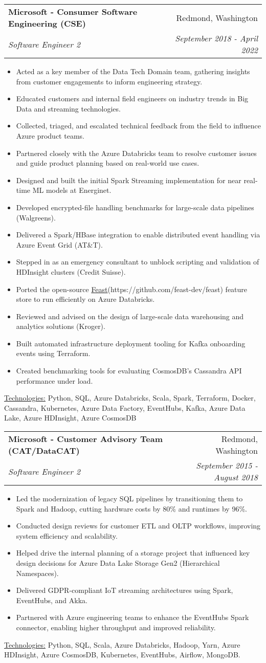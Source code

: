 \documentclass[letterpaper,11pt]{article}
\makeatletter
\newcommand{\resumeItem}[1]{%
  \item\small{
    #1
  }
}
\newcommand{\resumeSubheading}[4]{
  \vspace{8pt}\item%
    \begin{tabular*}{0.97\textwidth}[t]{l@{\extracolsep{\fill}}r}
      \textbf{#1} & #2 \\
      \textit{\small#3} & \textit{\small #4} \\
    \end{tabular*}\vspace{-5pt}
}
\newcommand{\resumeItemListStart}{\begin{itemize}}
\newcommand{\resumeItemListEnd}{\end{itemize}\vspace{-5pt}}
\newcommand{\resumeTech}[2]{
 \underline{#1:} #2
}
\makeatother
\begin{document}
    \newpage

    \resumeSubheading
      {Microsoft - Consumer Software Engineering (CSE)}{Redmond, Washington}
      {Software Engineer 2}{September 2018 - April 2022}
      \resumeItemListStart
      \resumeItem{Acted as a key member of the Data Tech Domain team, gathering insights from customer engagements to inform engineering strategy.}
      \resumeItem{Educated customers and internal field engineers on industry trends in Big Data and streaming technologies.}
      \resumeItem{Collected, triaged, and escalated technical feedback from the field to influence Azure product teams.}
      \resumeItem{Partnered closely with the Azure Databricks team to resolve customer issues and guide product planning based on real-world use cases.}
      \resumeItem{Designed and built the initial Spark Streaming implementation for near real-time ML models at Energinet.}
      \resumeItem{Developed encrypted-file handling benchmarks for large-scale data pipelines (Walgreens).}
      \resumeItem{Delivered a Spark/HBase integration to enable distributed event handling via Azure Event Grid (AT&T).}
      \resumeItem{Stepped in as an emergency consultant to unblock scripting and validation of HDInsight clusters (Credit Suisse).}
      \resumeItem{Ported the open-source \href{https://github.com/feast-dev/feast}{Feast}(https://github.com/feast-dev/feast) feature store to run efficiently on Azure Databricks.}
      \resumeItem{Reviewed and advised on the design of large-scale data warehousing and analytics solutions (Kroger).}
      \resumeItem{Built automated infrastructure deployment tooling for Kafka onboarding events using Terraform.}
      \resumeItem{Created benchmarking tools for evaluating CosmosDB’s Cassandra API performance under load.}
      \resumeItemListEnd
      \resumeTech{Technologies}{Python, SQL, Azure Databricks, Scala, Spark, Terraform, Docker, Cassandra, Kubernetes, Azure Data Factory, EventHubs, Kafka, Azure Data Lake, Azure HDInsight, Azure CosmosDB}\\

    \resumeSubheading
      {Microsoft - Customer Advisory Team (CAT/DataCAT)}{Redmond, Washington}
      {Software Engineer 2}{September 2015 - August 2018}
      \resumeItemListStart
      \resumeItem{Led the modernization of legacy SQL pipelines by transitioning them to Spark and Hadoop, cutting hardware costs by 80\% and runtimes by 96\%.}
      \resumeItem{Conducted design reviews for customer ETL and OLTP workflows, improving system efficiency and scalability.}
      \resumeItem{Helped drive the internal planning of a storage project that influenced key design decisions for Azure Data Lake Storage Gen2 (Hierarchical Namespaces).}
      \resumeItem{Delivered GDPR-compliant IoT streaming architectures using Spark, EventHubs, and Akka.}
      \resumeItem{Partnered with Azure engineering teams to enhance the EventHubs Spark connector, enabling higher throughput and improved reliability.}
      \resumeItemListEnd
      \resumeTech{Technologies}{Python, SQL, Scala, Azure Databricks, Hadoop, Yarn, Azure HDInsight, Azure CosmosDB, Kubernetes, EventHubs, Airflow, MongoDB.}\\
\end{document}
